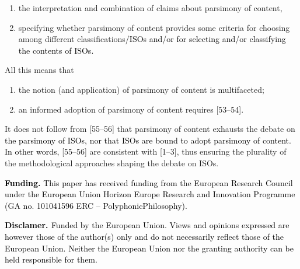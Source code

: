 \begin{enumerate}

\item the interpretation and combination of claims about parsimony of content,

\item specifying whether parsimony of content provides some criteria for choosing among different classifications\textcolor{black}{/ISOs and/or for} \textcolor{black}{selecting and/or classifying the contents of ISOs.}



\end{enumerate}

All this means that



\begin{enumerate}

\item the notion (and application) of parsimony of content is multifaceted;

\item an informed adoption of parsimony of content requires [53–54].

\end{enumerate}

It does not follow from [55–56] that parsimony of content exhausts the debate on \textcolor{black}{the parsimony of ISOs, nor that ISOs are bound to adopt parsimony of content. In other words, }[55–56] are consistent with [1–3], thus ensuring the plurality of the methodological approaches shaping the debate on ISOs.



\textbf{\textcolor{black}{Funding.}}\textcolor{black}{ This paper has received funding from the European Research Council under the European Union Horizon Europe Research and Innovation Programme (GA no. 101041596 ERC -- PolyphonicPhilosophy).}



\textbf{\textcolor{black}{Disclamer. }}\textcolor{black}{Funded by the European Union. Views and opinions expressed are however those of the author(s) only and do not necessarily reflect those of the European Union. Neither the European Union nor the granting authority can be held responsible for them.}




